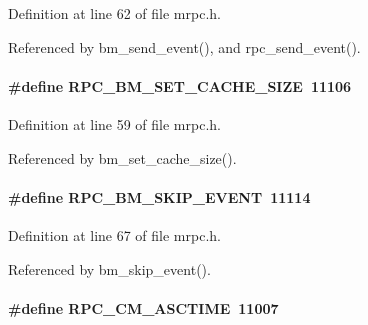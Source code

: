 \begin{DoxyItemize}
\item 
\end{DoxyItemize}

Definition at line 62 of file mrpc.h.

Referenced by bm\_\-send\_\-event(), and rpc\_\-send\_\-event().
\paragraph[{RPC\_\-BM\_\-SET\_\-CACHE\_\-SIZE}]{\setlength{\rightskip}{0pt plus 5cm}\#define RPC\_\-BM\_\-SET\_\-CACHE\_\-SIZE~11106}\hfill\label{group__mrpcdefineh_ga7467f8651a147cf7a9551892496b958e}

\begin{DoxyItemize}
\item 
\end{DoxyItemize}

Definition at line 59 of file mrpc.h.

Referenced by bm\_\-set\_\-cache\_\-size().
\paragraph[{RPC\_\-BM\_\-SKIP\_\-EVENT}]{\setlength{\rightskip}{0pt plus 5cm}\#define RPC\_\-BM\_\-SKIP\_\-EVENT~11114}\hfill\label{group__mrpcdefineh_gada948fec43038394de1d672926fa354e}

\begin{DoxyItemize}
\item 
\end{DoxyItemize}

Definition at line 67 of file mrpc.h.

Referenced by bm\_\-skip\_\-event().
\paragraph[{RPC\_\-CM\_\-ASCTIME}]{\setlength{\rightskip}{0pt plus 5cm}\#define RPC\_\-CM\_\-ASCTIME~11007}\hfill\label{group__mrpcdefineh_ga1a312b4bf66e355c7508e611485b65e0}

